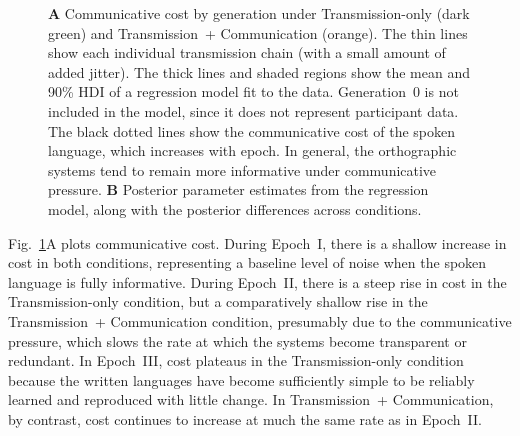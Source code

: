 \documentclass[doc,biblatex]{apa7}
\begin{document}
	\begin{figure}
	\vspace*{2pt}
	\caption{\textbf{A} Communicative cost by generation under Transmission-only (dark green) and Transmission~+ Communication (orange). The thin lines show each individual transmission chain (with a small amount of added jitter). The thick lines and shaded regions show the mean and 90\% HDI of a regression model fit to the data. Generation~0 is not included in the model, since it does not represent participant data. The black dotted lines show the communicative cost of the spoken language, which increases with epoch. In general, the orthographic systems tend to remain more informative under communicative pressure. \textbf{B} Posterior parameter estimates from the regression model, along with the posterior differences across conditions.}
	\label{cost_con}
	\end{figure}

Fig.~\ref{cost_con}A plots communicative cost. During Epoch~I, there is a shallow increase in cost in both conditions, representing a baseline level of noise when the spoken language is fully informative. During Epoch~II, there is a steep rise in cost in the Transmission-only condition, but a comparatively shallow rise in the Transmission~+ Communication condition, presumably due to the communicative pressure, which slows the rate at which the systems become transparent or redundant. In Epoch~III, cost plateaus in the Transmission-only condition because the written languages have become sufficiently simple to be reliably learned and reproduced with little change. In Transmission~+ Communication, by contrast, cost continues to increase at much the same rate as in Epoch~II.
\end{document}
